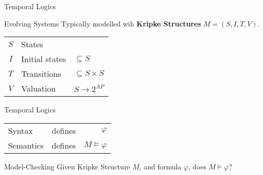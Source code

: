 \begin{frame}{Temporal Logics}

  \begin{block}{Evolving Systems}
    Typically modelled wih \textbf{Kripke Structures} $M=(S,I,T,V)$.\\

    \hfill
    \begin{tabular}{c l l}
      $S$ & States &\\
      $I$ & Initial states & $\subseteq S$\\
      $T$ & Transitions & $\subseteq S\times S$\\
      $V$ & Valuation & $S\rightarrow 2^{AP}$
    \end{tabular}
  \end{block}
  \vfill
  \begin{block}{Temporal Logics}
    \begin{tabular}{l c r}
    Syntax & defines & $\varphi$\\
    Semantics & defines & $M\models\varphi$
    \end{tabular}
  \end{block}
  \vfill
  \begin{block}{Model-Checking}
    Given Kripke Structure $M$, and formula $\varphi$, does $M\models\varphi$?
  \end{block}
  
\end{frame}


